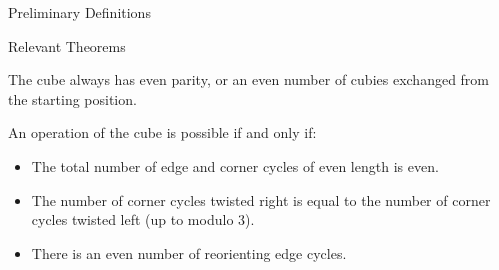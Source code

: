\documentclass[final]{beamer}
\newlength{\colwidth}
\begin{document}
\begin{frame}[t]
\begin{columns}[t]
\begin{column}{\colwidth}
\begin{alertblock}{Preliminary Definitions}

  \end{alertblock}
 
  \begin{block}{Relevant Theorems}

The cube always has even parity, or an even number of cubies
exchanged from the starting position.

      An operation of the cube is possible if and only if:
            \begin{itemize}
              \item The total number of edge and corner cycles of even length is even.
              \item The number of corner cycles twisted right is equal to the number of corner cycles twisted left (up to modulo $3$).
              \item There is an even number of reorienting edge cycles.








    \end{itemize}

  \end{block}
  


\end{column}


\end{columns}
\end{frame}
\end{document}
